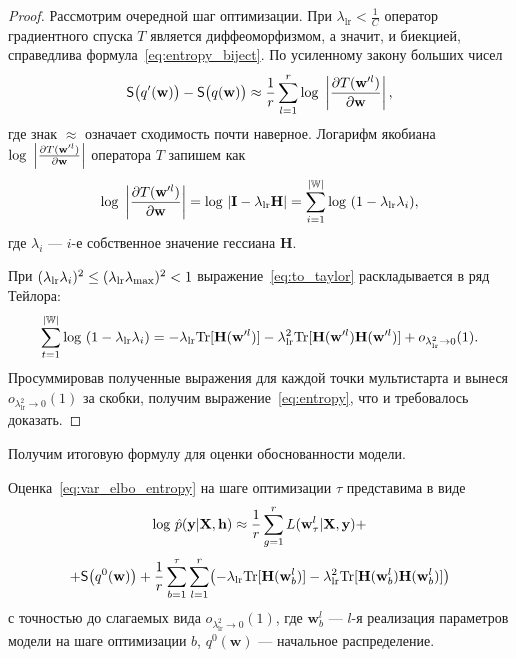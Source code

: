 \begin{proof}




Рассмотрим очередной шаг оптимизации. При $\lambda_{\text{lr}}<\frac{1}{C}$ оператор градиентного спуска $T$ является диффеоморфизмом, а значит, и биекцией, справедлива формула~\eqref{eq:entropy_biject}.
По усиленному закону больших чисел 
\[
	\mathsf{S}\bigl(q'(\mathbf{w})\bigr) -  \mathsf{S}\bigl(q(\mathbf{w})\bigr)  \approx  \frac{1}{r}\sum_{l=1}^r \textnormal{log}~\left|\frac{\partial{T(\mathbf{w}'^l)}}{\partial{\mathbf{w}}}\right|,
\]
где знак $\approx$ означает сходимость почти наверное.
Логарифм якобиана  $\textnormal{log}~\left|\frac{\partial{T(\mathbf{w}'^l)}}{\partial{\mathbf{w}}}\right|$ оператора $T$ запишем как%
\begin{equation}
\label{eq:to_taylor}
	\textnormal{log}~\left|\frac{\partial{T(\mathbf{w}'^l)}}{\partial{\mathbf{w}}}\right| = \textnormal{log}~|\mathbf{I} - \lambda_{\text{lr}}\mathbf{H}| = \sum_{i=1}^{|\mathbb{W}|} \textnormal{log}~(1-\lambda_{\text{lr}}\lambda_i),
\end{equation}
где $\lambda_i$ --- $i$-е собственное значение гессиана $\mathbf{H}$.

При $(\lambda_{\text{lr}}\lambda_i) ^ 2 \leq (\lambda_{\text{lr}}\lambda_\textnormal{max})^2 < 1$ выражение~\eqref{eq:to_taylor} раскладывается в ряд Тейлора:
\[
	 \sum_{t=1}^{|\mathbb{W}|} \textnormal{log}~(1-\lambda_{\text{lr}}\lambda_i) =  -\lambda_{\text{lr}} \textnormal{Tr}[\mathbf{H}(\mathbf{w}'^l)] - \lambda_{\text{lr}}^2 \textnormal{Tr}[\mathbf{H}(\mathbf{w}'^l)\mathbf{H}(\mathbf{w}'^l)] + o_{\lambda_{\text{lr}}^2 \to 0}(1).
\]
Просуммировав полученные выражения для каждой точки мультистарта и вынеся $o_{\lambda_{\text{lr}}^2 \to 0}(1)$ за скобки, получим выражение~\eqref{eq:entropy}, что и требовалось доказать.

\end{proof} 	


Получим итоговую формулу для оценки обоснованности модели.
\begin{theorem}\label{st:st2}
Оценка~\eqref{eq:var_elbo_entropy} на шаге оптимизации $\tau$ представима в виде
\begin{equation}
\label{eq:ev_grad_full}
\textnormal{log}~\hat{p}(\mathbf{y}|\mathbf{X}, \mathbf{h}) \approx \frac{1}{r} \sum_{g = 1}^r L(\mathbf{w}^l_\tau| \mathbf{X}, \mathbf{y})  + 
\end{equation}
\[
+\mathsf{S}\big(q^0(\mathbf{w})\bigr) + \frac{1}{r}\sum_{b=1}^\tau\sum_{l=1}^r \bigl(-\lambda_{\text{lr}} \textnormal{Tr}[\mathbf{H}(\mathbf{w}_b^l)] - \lambda_{\text{lr}}^2 \textnormal{Tr}[\mathbf{H}(\mathbf{w}_b^l)\mathbf{H}(\mathbf{w}_b^l)]  \bigr) 
\]
с точностью до слагаемых вида $o_{\lambda_{\text{lr}}^2 \to 0}(1)$,
где $\mathbf{w}_b^l$ --- $l$-я реализация параметров модели на шаге оптимизации $b$, $q^0(\mathbf{w})$ --- начальное распределение.
\end{theorem}



